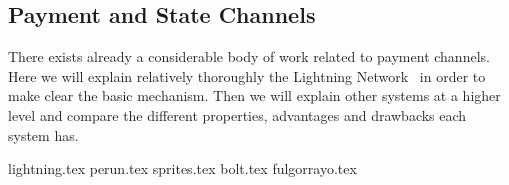 \subsection{Payment and State Channels}
\label{sec:literaturereview:channels}
  There exists already a considerable body of work related to payment channels. Here we
  will explain relatively thoroughly the Lightning Network~\cite{lightning} in order to
  make clear the basic mechanism. Then we will explain other systems at a higher level and
  compare the different properties, advantages and drawbacks each system has.

  {lightning.tex}
  {perun.tex}
  {sprites.tex}
  {bolt.tex}
  {fulgorrayo.tex}
